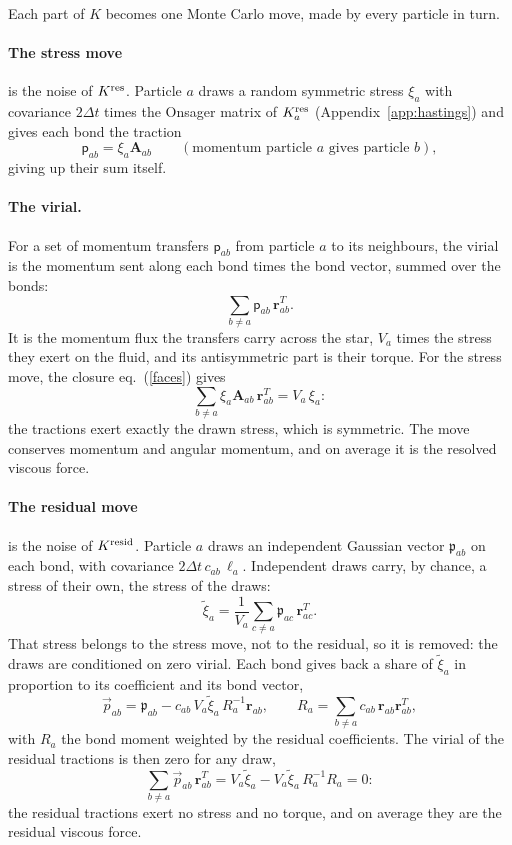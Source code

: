 \documentclass[11pt,aps,preprint,nofootinbib,superscriptaddress,tightenlines]{revtex4-2}
\newcommand{\pf}{\bm{\mathsf p}}
\def\st{\begin{equation}}
\def\stp{\end{equation}}
\def\Eq#1{eq.~(\ref{#1})}
\def\App#1{Appendix~\ref{#1}}
\let\oldparagraph\paragraph
\renewcommand{\paragraph}{\par\bigskip\oldparagraph}
\begin{document}
Each part of $K$ becomes one Monte Carlo move, made by every particle in turn.

\paragraph{The stress move} is the noise of $K^{\rm res}$.  Particle $a$ draws a random symmetric stress $\xi_a$ with covariance $2\Delta t$ times the
Onsager matrix of $K_a^{\rm res}$ (\App{app:hastings}) and gives each bond the traction
\st
\pf_{ab}=\xi_a\bm A_{ab}\qquad(\text{momentum particle }a\text{ gives particle }b),
\stp
giving up their sum itself.

\paragraph{The virial.}  For a set of momentum transfers $\pf_{ab}$ from particle $a$ to its neighbours, the virial is the momentum sent along each
bond times the bond vector, summed over the bonds:
\st
\sum_{b\neq a}\pf_{ab}\,\bm r_{ab}^T .
\stp
It is the momentum flux the transfers carry across the star, $V_a$ times the stress they exert on the fluid, and its antisymmetric part is
their torque.  For the stress move, the closure \Eq{faces} gives
\st
\sum_{b\neq a}\xi_a\bm A_{ab}\,\bm r_{ab}^T=V_a\,\xi_a :
\stp
the tractions exert exactly the drawn stress, which is symmetric.  The move conserves momentum and angular momentum, and on average it is the
resolved viscous force.

\paragraph{The residual move} is the noise of $K^{\rm resid}$.  Particle $a$ draws an independent Gaussian vector $\mathfrak p_{ab}$ on each bond, with
covariance $2\Delta t\,c_{ab}\,\ell_a$.  Independent draws carry, by chance, a stress of their own, the stress of the draws:
\st
\tilde\xi_a=\frac1{V_a}\sum_{c\neq a}\mathfrak p_{ac}\,\bm r_{ac}^T .
\stp
That stress belongs to the stress move, not to the residual, so it is removed: the draws are conditioned on zero virial.  Each bond gives
back a share of $\tilde\xi_a$ in proportion to its coefficient and its bond vector,
\st
\vec p_{ab}=\mathfrak p_{ab}-c_{ab}\,V_a\tilde\xi_a\,R_a^{-1}\bm r_{ab},\qquad R_a=\sum_{b\neq a}c_{ab}\,\bm r_{ab}\bm r_{ab}^T ,
\stp
with $R_a$ the bond moment weighted by the residual coefficients.  The virial of the residual tractions is then zero for any draw,
\st
\sum_{b\neq a}\vec p_{ab}\,\bm r_{ab}^T=V_a\tilde\xi_a-V_a\tilde\xi_a\,R_a^{-1}R_a=0 :
\stp
the residual tractions exert no stress and no torque, and on average they are the residual viscous force.
\end{document}
